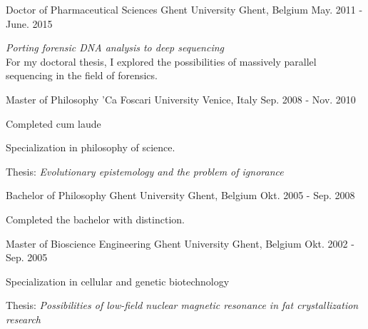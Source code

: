 

\begin{cventries}

  \cventry
    {Doctor of Pharmaceutical Sciences} %
    {Ghent University} %
    {Ghent, Belgium} %
    {May. 2011 - June. 2015} %
    {
      \begin{cvitems} %
      \item {\emph{Porting forensic DNA analysis to deep sequencing}
          \\ For my doctoral thesis, I explored the possibilities of
          massively parallel sequencing in the field of forensics.}
      \end{cvitems}
    }

  \cventry
    {Master of Philosophy} %
    {'Ca Foscari University} %
    {Venice, Italy} %
    {Sep. 2008 - Nov. 2010} %
    {
      \begin{cvitems} %
      \item {Completed cum laude}
      \item {Specialization in philosophy of science.}
      \item {Thesis: \emph{Evolutionary epistemology and the problem
            of ignorance}}
      \end{cvitems}
    }

  \cventry
    {Bachelor of Philosophy} %
    {Ghent University} %
    {Ghent, Belgium} %
    {Okt. 2005 - Sep. 2008} %
    {
      \begin{cvitems} %
        \item {Completed the bachelor with distinction.}
      \end{cvitems}
    }

  \cventry
    {Master of Bioscience Engineering} %
    {Ghent University} %
    {Ghent, Belgium} %
    {Okt. 2002 - Sep. 2005} %
    {
      \begin{cvitems} %
        \item {Specialization in cellular and genetic biotechnology}
        \item {Thesis: \emph{Possibilities of low-field nuclear
              magnetic resonance in fat crystallization research}}
      \end{cvitems}
    }


\end{cventries}
